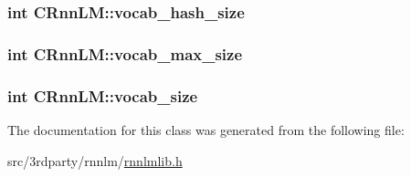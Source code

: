 \subsubsection[{vocab\+\_\+hash\+\_\+size}]{\setlength{\rightskip}{0pt plus 5cm}int C\+Rnn\+L\+M\+::vocab\+\_\+hash\+\_\+size}\hypertarget{class_c_rnn_l_m_a296a24a5b4e71a789a77b8cd7c3718d6}{}\label{class_c_rnn_l_m_a296a24a5b4e71a789a77b8cd7c3718d6}
\subsubsection[{vocab\+\_\+max\+\_\+size}]{\setlength{\rightskip}{0pt plus 5cm}int C\+Rnn\+L\+M\+::vocab\+\_\+max\+\_\+size}\hypertarget{class_c_rnn_l_m_ac3c72a904bf84af933c1889aeea7e522}{}\label{class_c_rnn_l_m_ac3c72a904bf84af933c1889aeea7e522}
\subsubsection[{vocab\+\_\+size}]{\setlength{\rightskip}{0pt plus 5cm}int C\+Rnn\+L\+M\+::vocab\+\_\+size}\hypertarget{class_c_rnn_l_m_a4c8ca419abe51c526d07a7a939271511}{}\label{class_c_rnn_l_m_a4c8ca419abe51c526d07a7a939271511}


The documentation for this class was generated from the following file\+:\begin{DoxyCompactItemize}
\item 
src/3rdparty/rnnlm/\hyperlink{rnnlmlib_8h}{rnnlmlib.\+h}\end{DoxyCompactItemize}
